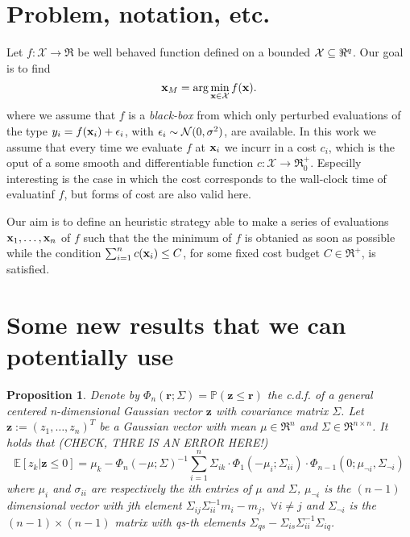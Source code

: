 \documentclass{article} %
\newcommand{\E}{\mathbb{E}}
\newcommand{\Prob}{\mathbb{P}}
\newcommand{\bz}{\textbf{z}}
\newtheorem{proposition}{Proposition}
\begin{document}


\section{Problem, notation, etc.}


Let $f: {\mathcal X} \to \Re$ be well behaved function defined on a bounded ${\mathcal X} \subseteq \Re^{q}$. Our goal is to find 
$$\mathbf{x}_{M} = \arg \min_{\mathbf{x} \in {\mathcal X}} f(\mathbf{x}).$$ 
where we  assume that $f$ is a \emph{black-box} from which only perturbed evaluations of the type $y_i = f(\mathbf{x}_i) + \epsilon_i$, with $\epsilon_i \sim\mathcal{N}(0,\sigma^2)$, are  available.  In this work we assume that every time we evaluate $f$ at $\mathbf{x}_i$ we incurr in a cost $c_i$, which is the oput of a some smooth and differentiable function  $c: {\mathcal X} \to \Re_{0}^{+}$. Especilly interesting is the case in which the cost corresponds to the wall-clock time of evaluatinf $f$, but forms of cost are also valid here.

Our aim is to define  an heuristic strategy able to make a series of evaluations $\mathbf{x}_1,\dots,\mathbf{x}_n$ of $f$ such that the the minimum of $f$ is obtanied as soon as possible while the condition $\sum_{i=1}^n c(\mathbf{x}_i) \leq C$, for some fixed cost budget $C \in \Re^+$, is satisfied.



 \section{Some new results that we can potentially use}

\begin{proposition}
Denote by  $\Phi_n (\textbf{r}; \Sigma) = \Prob(\bz \leq \textbf{r})$ the c.d.f. of a general  centered n-dimensional Gaussian vector $\bz$ with covariance matrix $\Sigma$. Let $\bz := (z_1,\dots,z_n)^T$ be a Gaussian vector with mean $\mu \in \Re^n$ and $\Sigma \in \Re^{n\times n}$. It holds that (CHECK, THRE IS AN ERROR HERE!)
\begin{equation} \nonumber
\E [ z_k|\bz \leq 0] = \mu_k -  \Phi_n ( -\mu; \Sigma)^{-1} \sum_{i=1}^n \Sigma_{ik} \cdot \Phi_1(-\mu_i;\Sigma_{ii}) \cdot \Phi_{n-1}(0;\mu_{\neg i}, \Sigma_{\neg i})
\end{equation}
 where $\mu_i$ and $\sigma_{ii}$ are respectively the ith entries of $\mu$ and $\Sigma$, $\mu_{\neg i}$ is the $(n-1)$ dimensional vector with jth element $\Sigma_{ij}\Sigma_{ii}^{-1}m_i -m_j,$ $\forall i\neq j$  and $\Sigma_{\neg i}$ is the $(n-1) \times (n-1)$ matrix with qs-th elements $\Sigma_{qs} - \Sigma_{is} \Sigma_{ii}^{-1} \Sigma_{iq}$.  
\end{proposition}
\end{document}

